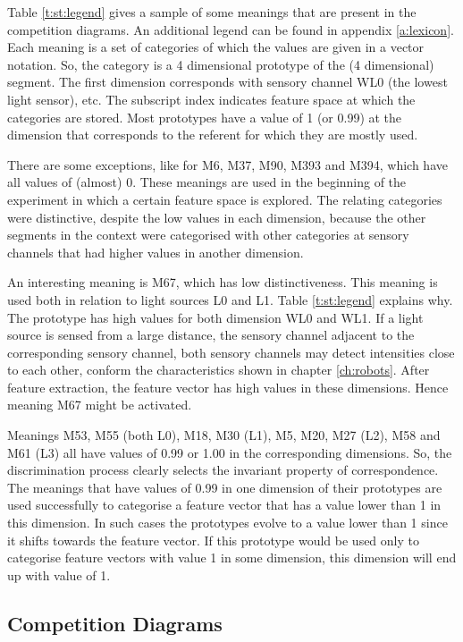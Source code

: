 Table \ref{t:st:legend} gives a sample of some meanings that are present in the competition diagrams. An additional legend can be found in appendix \ref{a:lexicon}. Each meaning is a set of categories of which the values are given in a vector notation. So, the category is a 4 dimensional prototype of the (4 dimensional) segment. The first dimension corresponds with sensory channel WL0 (the lowest light sensor), etc. The subscript index indicates feature space at which the categories are stored. Most prototypes have a value of 1 (or 0.99) at the dimension that corresponds to the referent for which they are mostly used. 

There are some exceptions, like for M6, M37, M90, M393 and M394, which have all values of (almost) 0. These meanings are used in the beginning of the experiment in which a certain feature space is explored. The relating categories were distinctive, despite the low values in each dimension, because the other segments in the context were categorised with other categories at sensory channels that had higher values in another dimension.

An interesting meaning is M67, which has low distinctiveness. This meaning is used both in relation to light sources L0 and L1. Table \ref{t:st:legend} explains why. The prototype has high values for both dimension WL0 and WL1. If a light source is sensed from a large distance, the sensory channel adjacent to the corresponding sensory channel, both sensory channels may detect intensities close to each other, conform the characteristics shown in chapter \ref{ch:robots}. After feature extraction, the feature vector has high values in these dimensions. Hence meaning M67 might be activated. 


Meanings M53, M55 (both L0), M18, M30 (L1), M5, M20, M27 (L2), M58 and M61 (L3) all have values of 0.99 or 1.00 in the corresponding dimensions.  So, the discrimination process clearly selects the invariant property of correspondence. The meanings that have values of 0.99 in one dimension of their prototypes are used successfully to categorise a feature vector that has a value lower than 1 in this dimension. In such cases the prototypes evolve to a value lower than 1 since it shifts towards the feature vector. If this prototype would be used only to categorise feature vectors with value 1 in some dimension, this dimension will end up with value of 1.


\subsection{Competition Diagrams}\label{s:basic:comp}

